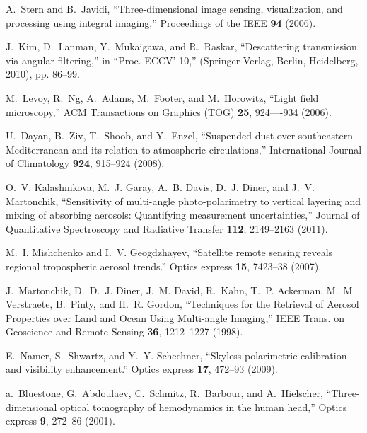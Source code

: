 \documentclass[10pt,letterpaper]{article}
\begin{document}

\begin{thebibliography}{10}
\newcommand{\enquote}[1]{``#1''}

A.~Stern and B.~Javidi, \enquote{{Three-dimensional image sensing,
  visualization, and processing using integral imaging},} Proceedings of the
  IEEE \textbf{94} (2006).

J.~Kim, D.~Lanman, Y.~Mukaigawa, and R.~Raskar, \enquote{{Descattering
  transmission via angular filtering},} in \enquote{Proc. ECCV' 10,}
  (Springer-Verlag, Berlin, Heidelberg, 2010), pp. 86--99.

M.~Levoy, R.~Ng, A.~Adams, M.~Footer, and M.~Horowitz, \enquote{{Light field
  microscopy},} ACM Transactions on Graphics (TOG) \textbf{25}, 924----934
  (2006).

U.~Dayan, B.~Ziv, T.~Shoob, and Y.~Enzel, \enquote{{Suspended dust over
  southeastern Mediterranean and its relation to atmospheric circulations},}
  International Journal of Climatology \textbf{924}, 915--924 (2008).

O.~V. Kalashnikova, M.~J. Garay, A.~B. Davis, D.~J. Diner, and J.~V.
  Martonchik, \enquote{{Sensitivity of multi-angle photo-polarimetry to
  vertical layering and mixing of absorbing aerosols: Quantifying measurement
  uncertainties},} Journal of Quantitative Spectroscopy and Radiative Transfer
  \textbf{112}, 2149--2163 (2011).

M.~I. Mishchenko and I.~V. Geogdzhayev, \enquote{{Satellite remote sensing
  reveals regional tropospheric aerosol trends.}} Optics express \textbf{15},
  7423--38 (2007).

J.~Martonchik, D.~D.~J. Diner, J.~M. David, R.~Kahn, T.~P. Ackerman, M.~M.
  Verstraete, B.~Pinty, and H.~R. Gordon, \enquote{{Techniques for the
  Retrieval of Aerosol Properties over Land and Ocean Using Multi-angle
  Imaging},} IEEE Trans. on Geoscience and Remote Sensing \textbf{36},
  1212--1227 (1998).

E.~Namer, S.~Shwartz, and Y.~Y. Schechner, \enquote{{Skyless polarimetric
  calibration and visibility enhancement.}} Optics express \textbf{17}, 472--93
  (2009).

a.~Bluestone, G.~Abdoulaev, C.~Schmitz, R.~Barbour, and A.~Hielscher,
  \enquote{{Three-dimensional optical tomography of hemodynamics in the human
  head},} Optics express \textbf{9}, 272--86 (2001).


\end{thebibliography}
\end{document}

